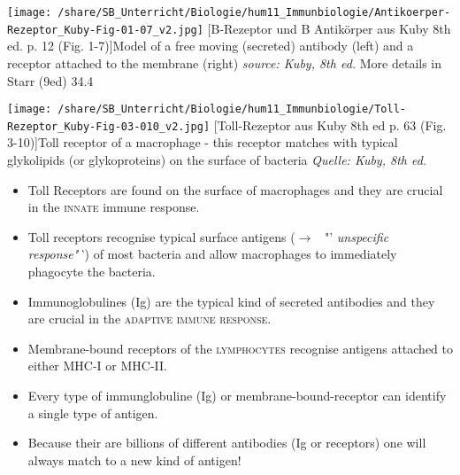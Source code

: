 		\begin{minipage}{9cm}
		  \texttt{[image: /share/SB\_Unterricht/Biologie/hum11\_Immunbiologie/Antikoerper-Rezeptor\_Kuby-Fig-01-07\_v2.jpg]}
		  [B-Rezeptor und B Antikörper aus Kuby 8th ed. p. 12 (Fig. 1-7)]{Model of a free moving (secreted) antibody (left) and a receptor attached to the membrane (right)  \textit{source: Kuby, 8th ed.} More details in   Starr (9ed) 34.4 }
		  \label{fig:RezeptorAntikoerper}
		\end{minipage}
		\begin{minipage}{6cm}
		 \texttt{[image: /share/SB\_Unterricht/Biologie/hum11\_Immunbiologie/Toll-Rezeptor\_Kuby-Fig-03-010\_v2.jpg]}
		  [Toll-Rezeptor aus Kuby 8th ed p. 63 (Fig. 3-10)]{Toll receptor of a macrophage - this receptor matches with typical glykolipids (or glykoproteins) on the surface of bacteria \textit{Quelle: Kuby, 8th ed.}}
		  \label{fig:TollRezptor}
		\end{minipage}

		\begin{mdframed}[style=exampledefault, userdefinedwidth=16cm,frametitle={Toll-receptors, Immunoglobulines, cell-bound Receptors }\label{mat:BEISPIELMATERIAL}]
			\begin{itemize}
				\item Toll Receptors are found on the surface of macrophages and they are crucial in the \textsc{innate} immune response.

				\item Toll receptors recognise typical surface antigens ($\rightarrow$~ "' \textit{unspecific response"`}) of most bacteria and allow macrophages to immediately phagocyte the bacteria.

				\item Immunoglobulines (Ig) are the typical kind of secreted antibodies and they are crucial in the \textsc{adaptive immune response}.

				\item Membrane-bound receptors of the \textsc{lymphocytes} recognise antigens attached to either  MHC-I or MHC-II.

				\item Every type of immunglobuline (Ig) or membrane-bound-receptor can identify a single type of antigen.

				\item Because their are billions of different antibodies (Ig or receptors) one will always match to a new kind of antigen!
			\end{itemize}
		\end{mdframed}





